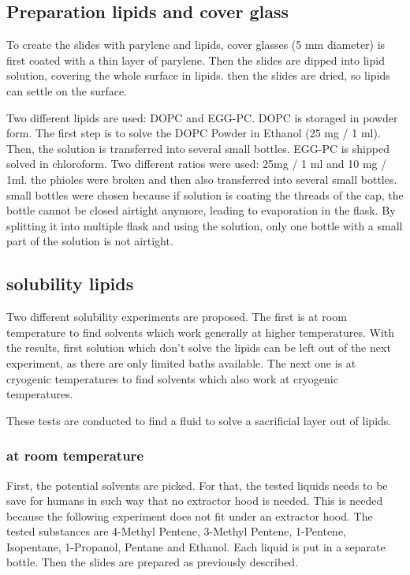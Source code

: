\subsection{Preparation lipids and cover glass}

To create the slides with parylene and lipids, cover glasses (5 mm diameter) is first coated with a thin layer of parylene. Then the slides are dipped into lipid solution, covering the whole surface in lipids. then the slides are dried, so lipids can settle on the surface. 

Two different lipids are used: DOPC and EGG-PC. DOPC is storaged in powder form. The first step is to solve the DOPC Powder in Ethanol (25 mg / 1 ml). Then, the solution is transferred into several small bottles. EGG-PC is shipped solved in chloroform. Two different ratios were used: 25mg / 1 ml and 10 mg / 1ml. the phioles were broken and then also transferred into several small bottles. small bottles were chosen because if solution is coating the threads of the cap, the bottle cannot be closed airtight anymore, leading to evaporation in the flask. By splitting it into multiple flask and using the solution, only one bottle with a small part of the solution is not airtight.

\subsection{solubility lipids}

Two different solubility experiments are proposed. The first is at room temperature to find solvents which work generally at higher temperatures. With the results, first solution which don't solve the lipids can be left out of the next experiment, as there are only limited baths available. The next one is at cryogenic temperatures to find solvents which also work at cryogenic temperatures.

These tests are conducted to find a fluid to solve a sacrificial layer out of lipids.

\subsubsection{at room temperature}

First, the potential solvents are picked. For that, the tested liquids needs to be save for humans in such way that no extractor hood is needed. This is needed because the following experiment does not fit under an extractor hood. The tested substances are 4-Methyl Pentene, 3-Methyl Pentene, 1-Pentene, Isopentane, 1-Propanol, Pentane and Ethanol. Each liquid is put in a separate bottle. Then the slides are prepared  as previously described.




